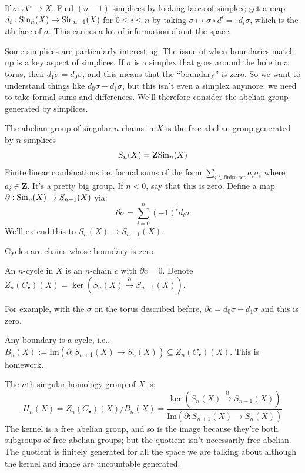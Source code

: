 If $\sigma:\Delta^n\to X$. Find $(n-1)$-simplices by looking faces of simplex; get a map $d_i:\mathrm{Sin}_n(X)\to\mathrm{Sin}_{n-1}(X)$ for $0\leq i\leq n$ by taking $\sigma\mapsto\sigma\circ d^i=: d_i\sigma$, which is the $i$th face of $\sigma$. This carries a lot of information about the space.

Some simplices are particularly interesting. The issue of when boundaries match up is a key aspect of simplices. If $\sigma$ is a simplex that goes around the hole in a torus, then $d_1\sigma = d_0\sigma$, and this means that the ``boundary'' is zero. So we want to understand things like $d_0\sigma - d_1\sigma$, but this isn't even a simplex anymore; we need to take formal sums and differences. We'll therefore consider the abelian group generated by simplices.
\begin{definition}
The abelian group of singular $n$-chains in $X$ is the free abelian group generated by $n$-simplices
$$S_n(X) = \mathbf{Z}\mathrm{Sin}_n(X)$$
Finite linear combinations i.e. formal sums of the form $\sum_{i\in\text{finite set}}a_i\sigma_i$ where $a_i\in\mathbf{Z}$. It's a pretty big group. If $n<0$, say that this is zero. Define a map $\partial:\mathrm{Sin}_n(X)\to S_{n-1}(X)$ via:
$$\partial\sigma = \sum_{i=0}^n(-1)^i d_i\sigma$$
We'll extend this to $S_n(X) \to S_{n-1}(X)$.
\end{definition}
Cycles are chains whose boundary is zero.
\begin{definition}
An $n$-cycle in $X$ is an $n$-chain $c$ with $\partial c = 0$. Denote $Z_n(C_\bullet)(X) = \ker(S_n(X)\xrightarrow{\partial}S_{n-1}(X))$.
\end{definition}
For example, with the $\sigma$ on the torus described before, $\partial c = d_0\sigma - d_1\sigma$ and this is zero.
\begin{theorem}
Any boundary is a cycle, i.e., $B_n(X) := \mathrm{Im}(\partial:S_{n+1}(X)\to S_n(X))\subseteq Z_n(C_\bullet)(X)$. This is homework.
\end{theorem}
\begin{definition}
The $n$th singular homology group of $X$ is:
$$ H_n(X) = Z_n(C_\bullet)(X)/B_n(X) = \frac{\ker(S_n(X)\xrightarrow{\partial}S_{n-1}(X))}{\mathrm{Im}(\partial:S_{n+1}(X)\to S_n(X))}$$
The kernel is a free abelian group, and so is the image because they're both subgroups of free abelian groups; but the quotient isn't necessarily free abelian. The quotient is finitely generated for all the space we are talking about although the kernel and image are uncountable generated.
\end{definition}
